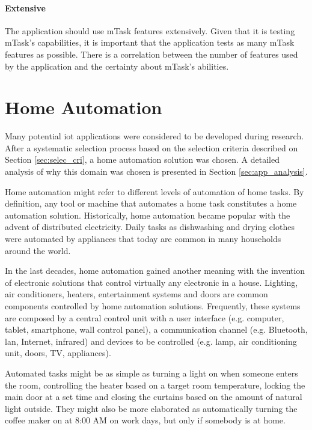 \paragraph{Extensive} The application should use \gls{mTask} features extensively. Given that it is testing \gls{mTask}'s capabilities, it is important that the application tests as many \gls{mTask} features as possible. There is a correlation between the number of features used by the application and the certainty about \gls{mTask}'s abilities.

\section{Home Automation}

Many potential \ac{iot} applications were considered to be developed during research. After a systematic selection process based on the selection criteria described on Section \ref{sec:selec_cri}, a home automation solution was chosen. A detailed analysis of why this domain was chosen is presented in Section \ref{sec:app_analysis}.

Home automation might refer to different levels of automation of home tasks. By definition, any tool or machine that automates a home task constitutes a home automation solution. Historically, home automation became popular with the advent of distributed electricity. Daily tasks as dishwashing and drying clothes were automated by appliances that today are common in many households around the world.

In the last decades, home automation gained another meaning with the invention of electronic solutions that control virtually any electronic in a house. Lighting, air conditioners, heaters, entertainment systems and doors are common components controlled by home automation solutions. Frequently, these systems are composed by a central control unit with a user interface (e.g. computer, tablet, smartphone, wall control panel), a communication channel (e.g. Bluetooth, \acs{lan}, Internet, infrared) and devices to be controlled (e.g. lamp, air conditioning unit, doors, TV, appliances).

Automated tasks might be as simple as turning a light on when someone enters the room, controlling the heater based on a target room temperature, locking the main door at a set time and closing the curtains based on the amount of natural light outside. They might also be more elaborated as automatically turning the coffee maker on at 8:00 AM on work days, but only if somebody is at home.

